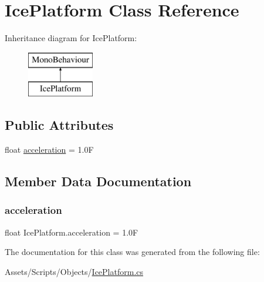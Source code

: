 \hypertarget{class_ice_platform}{}\section{Ice\+Platform Class Reference}
\label{class_ice_platform}
Inheritance diagram for Ice\+Platform\+:\begin{figure}[H]
\begin{center}
\leavevmode
\includegraphics[height=2.000000cm]{class_ice_platform}
\end{center}
\end{figure}
\subsection*{Public Attributes}
\begin{DoxyCompactItemize}
\item 
float \mbox{\hyperlink{class_ice_platform_ac049bab48bb4d34f1a3c6858cfc138d4}{acceleration}} = 1.\+0F
\end{DoxyCompactItemize}


\subsection{Member Data Documentation}
\mbox{\label{class_ice_platform_ac049bab48bb4d34f1a3c6858cfc138d4}} 
\subsubsection{\texorpdfstring{acceleration}{acceleration}}
{\footnotesize\ttfamily float Ice\+Platform.\+acceleration = 1.\+0F}



The documentation for this class was generated from the following file\+:\begin{DoxyCompactItemize}
\item 
Assets/\+Scripts/\+Objects/\mbox{\hyperlink{_ice_platform_8cs}{Ice\+Platform.\+cs}}\end{DoxyCompactItemize}
